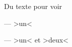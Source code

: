 \documentclass{scrartcl}
\newcommand*\mynew[2][\null]{ >#1< et >#2<}
\begin{document}
Du texte pour voir

--- \mynew{un}

--- \mynew[un]{deux}
\end{document}
